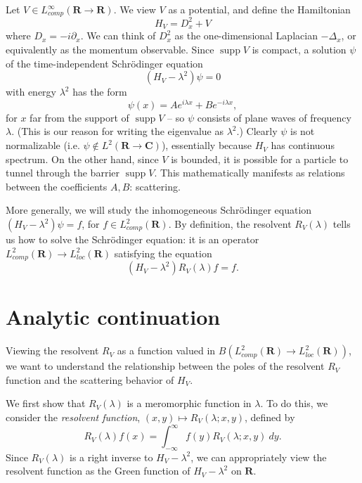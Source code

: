 \documentclass[12pt]{report}
\newcommand{\RR}{\mathbf{R}}
\newcommand{\CC}{\mathbf{C}}
\DeclareMathOperator{\supp}{supp}
\newcommand{\dfn}[1]{\emph{#1}\index{#1}}
\theoremstyle{definition}
\begin{document}
Let $V \in L^\infty_{comp}(\RR \to \RR)$. We view $V$ as a potential, and define the Hamiltonian
$$H_V = D_x^2 + V$$
where $D_x = -i\partial_x$. We can think of $D_x^2$ as the one-dimensional Laplacian $-\Delta_x$, or equivalently as the momentum observable. Since $\supp V$ is compact, a solution $\psi$ of the time-independent Schrödinger equation
$$(H_V - \lambda^2)\psi = 0$$
with energy $\lambda^2$ has the form
$$\psi(x) = Ae^{i\lambda x} + Be^{-i\lambda x},$$
for $x$ far from the support of $\supp V$ -- so $\psi$ consists of plane waves of frequency $\lambda$. (This is our reason for writing the eigenvalue as $\lambda^2$.) Clearly $\psi$ is not normalizable (i.e. $\psi \notin L^2(\RR \to \CC)$), essentially because $H_V$ has continuous spectrum. On the other hand, since $V$ is bounded, it is possible for a particle to tunnel through the barrier $\supp V$. This mathematically manifests as relations between the coefficients $A,B$: scattering.

More generally, we will study the inhomogeneous Schrödinger equation $(H_V - \lambda^2)\psi = f$, for $f \in L^2_{comp}(\RR)$. By definition, the resolvent $R_V(\lambda)$ tells us how to solve the Schrödinger equation: it is an operator $L^2_{comp}(\RR) \to L^2_{loc}(\RR)$ satisfying the equation
$$(H_V - \lambda^2)R_V(\lambda)f = f.$$

\section{Analytic continuation}
Viewing the resolvent $R_V$ as a function valued in $B(L^2_{comp}(\RR) \to L^2_{loc}(\RR))$, we want to understand the relationship between the poles of the resolvent $R_V$ function and the scattering behavior of $H_V$.

We first show that $R_V(\lambda)$ is a meromorphic function in $\lambda$. To do this, we consider the \dfn{resolvent function}, $(x, y) \mapsto R_V(\lambda; x, y)$, defined by
$$R_V(\lambda)f(x) = \int_{-\infty}^\infty f(y) R_V(\lambda; x, y) ~dy.$$
Since $R_V(\lambda)$ is a right inverse to $H_V - \lambda^2$, we can appropriately view the resolvent function as the Green function of $H_V - \lambda^2$ on $\RR$.
\end{document}

